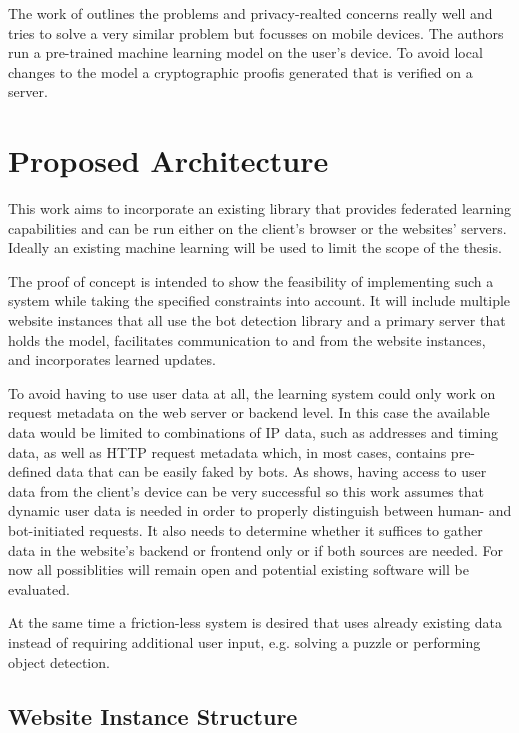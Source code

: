 \documentclass[
    fontsize=12pt,
    headings=small,
    parskip=half,           %
    bibliography=totoc,
    numbers=noenddot,       %
    open=any,               %
    ]{scrreprt}
\begin{document}
The work of \cite{PETS2021} outlines the problems and privacy-realted concerns really well and tries to solve a very similar problem but focusses on mobile devices. The authors run a pre-trained machine learning model on the user's device. To avoid local changes to the model a cryptographic proofis generated that is verified on a server.


\chapter{Proposed Architecture}

This work aims to incorporate an existing library that provides federated learning capabilities and can be run either on the client's browser or the websites' servers. Ideally an existing machine learning will be used to limit the scope of the thesis.

The proof of concept is intended to show the feasibility of implementing such a system while taking the specified constraints into account. It will include multiple website instances that all use the bot detection library and a primary server that holds the model, facilitates communication to and from the website instances, and incorporates learned updates.

To avoid having to use user data at all, the learning system could only work on request metadata on the web server or backend level. In this case the available data would be limited to combinations of IP data, such as addresses and timing data, as well as HTTP request metadata which, in most cases, contains pre-defined data that can be easily faked by bots. As \cite{PETS2021} shows, having access to user data from the client's device can be very successful so this work assumes that dynamic user data is needed in order to properly distinguish between human- and bot-initiated requests. It also needs to determine whether it suffices to gather data in the website's backend or frontend only or if both sources are needed. For now all possiblities will remain open and potential existing software will be evaluated.

At the same time a friction-less system is desired that uses already existing data instead of requiring additional user input, e.g. solving a puzzle or performing object detection.

\section{Website Instance Structure}
\end{document}
